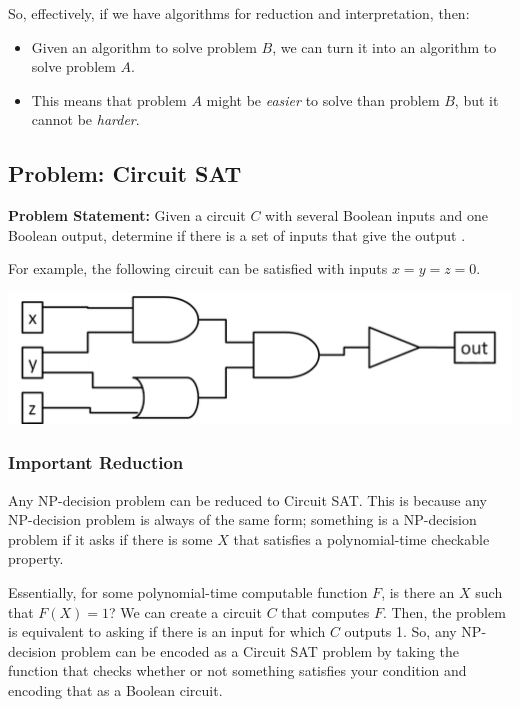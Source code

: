 \documentclass[letterpaper]{article}
\begin{document}
\bigskip 

So, effectively, if we have algorithms for reduction and interpretation, then: 
\begin{itemize}
    \item Given an algorithm to solve problem $B$, we can turn it into an algorithm to solve problem $A$. 
    \item This means that problem $A$ might be \emph{easier} to solve than problem $B$, but it cannot be \emph{harder}.
\end{itemize}

\subsection{Problem: Circuit SAT}
\textbf{Problem Statement:} Given a circuit $C$ with several Boolean inputs and one Boolean output, determine if there is a set of inputs that give the output . 

\bigskip 

For example, the following circuit can be satisfied with inputs $x = y = z = 0$.
\begin{center}
    \includegraphics[scale=0.5]{assets/circuit_sat.png}
\end{center}

\subsubsection{Important Reduction}
Any NP-decision problem can be reduced to Circuit SAT. This is because any NP-decision problem is always of the same form; something is a NP-decision problem if it asks if there is some $X$ that satisfies a polynomial-time checkable property. 

\bigskip 

Essentially, for some polynomial-time computable function $F$, is there an $X$ such that $F(X) = 1$? We can create a circuit $C$ that computes $F$. Then, the problem is equivalent to asking if there is an input for which $C$ outputs 1. So, any NP-decision problem can be encoded as a Circuit SAT problem by taking the function that checks whether or not something satisfies your condition and encoding that as a Boolean circuit. 
\end{document}
